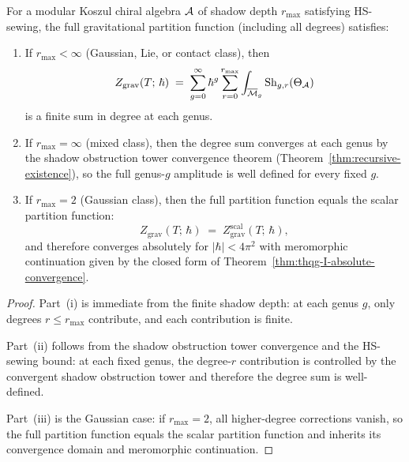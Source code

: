 \begin{theorem}
\label{thm:thqg-I-full-convergence}
For a modular Koszul chiral algebra $\mathcal{A}$ of shadow depth $r_{\max}$ satisfying HS-sewing, the full gravitational partition function (including all degrees) satisfies:
\begin{enumerate}[label=\textup{(\roman*)}]
\item If $r_{\max} < \infty$ (Gaussian, Lie, or contact class), then
\begin{equation}\label{eq:thqg-I-full-finite-depth}
Z_{\mathrm{grav}}(T;\,\hbar) \;=\; \sum_{g=0}^\infty \hbar^g \sum_{r=0}^{r_{\max}} \int_{\overline{\mathcal{M}}_g} \operatorname{Sh}_{g,r}(\Theta_{\mathcal{A}})
\end{equation}
is a finite sum in degree at each genus.
\item If $r_{\max} = \infty$ (mixed class), then the degree sum converges at each genus by the shadow obstruction tower convergence theorem \textup{(}Theorem~\ref{thm:recursive-existence}\textup{)}, so the full genus-$g$ amplitude is well defined for every fixed $g$.
\item If $r_{\max} = 2$ (Gaussian class), then the full partition function equals the scalar partition function:
\begin{equation}\label{eq:thqg-I-leading-term}
Z_{\mathrm{grav}}(T;\,\hbar) \;=\; Z_{\mathrm{grav}}^{\mathrm{scal}}(T;\,\hbar),
\end{equation}
and therefore converges absolutely for $|\hbar| < 4\pi^2$ with meromorphic continuation given by the closed form of Theorem~\ref{thm:thqg-I-absolute-convergence}.
\end{enumerate}
\end{theorem}

\begin{proof}
Part~(i) is immediate from the finite shadow depth: at each genus $g$,
only degrees $r \leq r_{\max}$ contribute, and each contribution is
finite.

Part~(ii) follows from the shadow obstruction tower convergence and the HS-sewing
bound: at each fixed genus, the degree-$r$ contribution is controlled
by the convergent shadow obstruction tower and therefore the degree sum is
well-defined.

Part~(iii) is the Gaussian case: if $r_{\max}=2$, all higher-degree
corrections vanish, so the full partition function equals the scalar
partition function and inherits its convergence domain and meromorphic
continuation.
\end{proof}


